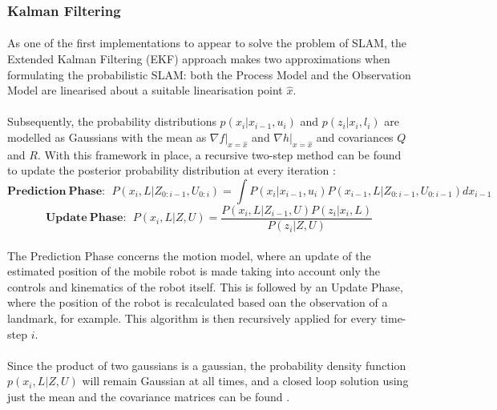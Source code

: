 \documentclass[12pt]{article}
\begin{document}
	\subsubsection{Kalman Filtering}
	\paragraph{}
	As one of the first implementations to appear to solve the problem of SLAM, the Extended Kalman Filtering (EKF) approach makes two approximations when formulating the probabilistic SLAM: both the Process Model and the Observation Model are linearised about a suitable linearisation point $\hat{x}$.

	\paragraph{}
	 Subsequently, the probability distributions $p(x_i|x_{i-1}, u_i)$ and $p(z_i|x_i, l_i)$ are modelled as Gaussians with the mean as $\nabla f|_{x=\hat{x}}$ and $\nabla h|_{x=\hat{x}}$ and covariances $Q$ and $R$. With this framework in place, a recursive two-step method can be found to update the posterior probability distribution at every iteration \cite{SLAMPartI}:
		\begin{equation*}
		\mathbf{Prediction\ Phase:}\ \ 
		P(x_{i},L|Z_{0:i-1}, U_{0:i}) = \int P(x_i | x_{i-1}, u_{i}) P(x_{i-1}, L |Z_{0:i-1}, U_{0:i-1})dx_{i-1}
		\end{equation*}
		\begin{equation*}
		\mathbf{Update\ Phase:} \ \  P(x_i, L | Z, U) = \frac{P(x_{i}, L | Z_{i-1}, U)P(z_i|x_i,L)}{P(z_i|Z, U)}
		\end{equation*}	 	
	\paragraph{}
	The Prediction Phase concerns the motion model, where an update of the estimated position of the mobile robot is made taking into account only the controls and kinematics of the robot itself. This is followed by an Update Phase, where the position of the robot is recalculated based oan the observation of a landmark, for example. This algorithm is then recursively applied for every time-step $i$. 	
	\paragraph{}	 
	 Since the product of two gaussians is a gaussian, the probability density function $p(x_i, L|Z, U)$ will remain Gaussian at all times, and a closed loop solution using just the mean and the covariance matrices can be found \cite{772544}.
\end{document}
